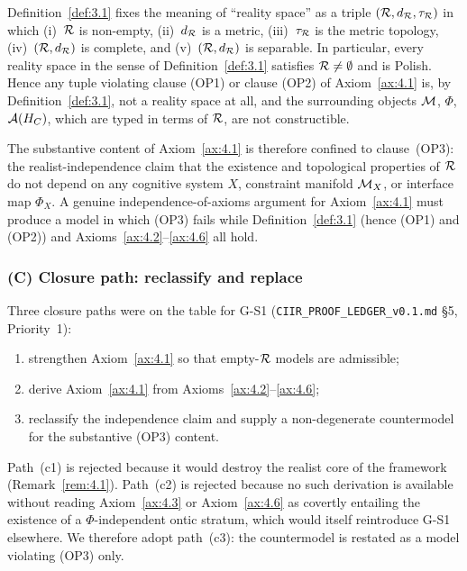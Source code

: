 \begin{remark}
\label{rem:4.1.op1op2.redundant}
Definition~\ref{def:3.1} fixes the meaning of ``reality space'' as a
triple $(\mathcal{R},d_{\mathcal{R}},\tau_{\mathcal{R}})$ in which (i)~$\mathcal{R}$ is non-empty,
(ii)~$d_{\mathcal{R}}$ is a metric, (iii)~$\tau_{\mathcal{R}}$ is the metric topology,
(iv)~$(\mathcal{R},d_{\mathcal{R}})$ is complete, and (v)~$(\mathcal{R},d_{\mathcal{R}})$ is
separable.  In particular, every reality space in the sense of
Definition~\ref{def:3.1} satisfies $\mathcal{R} \neq \emptyset$ and is
Polish.  Hence any tuple violating clause (OP1) or clause (OP2) of
Axiom~\ref{ax:4.1} is, by Definition~\ref{def:3.1}, not a reality
space at all, and the surrounding objects $\mathcal{M}$, $\Phi$, $\mathcal{A}(H_C)$,
which are typed in terms of $\mathcal{R}$, are not constructible.

The substantive content of Axiom~\ref{ax:4.1} is therefore confined
to clause~(OP3): the realist-independence claim that the existence
and topological properties of $\mathcal{R}$ do not depend on any cognitive
system $X$, constraint manifold $\mathcal{M}_X$, or interface map $\Phi_X$.
A genuine independence-of-axioms argument for Axiom~\ref{ax:4.1}
must produce a model in which (OP3) fails while
Definition~\ref{def:3.1} (hence (OP1) and (OP2)) and
Axioms~\ref{ax:4.2}--\ref{ax:4.6} all hold.
\end{remark}

\subsubsection*{(C) Closure path: reclassify and replace}

Three closure paths were on the table for G-S1
(\texttt{CIIR\_PROOF\_LEDGER\_v0.1.md} \S5, Priority~1):
\begin{enumerate}
  \item[(c1)] strengthen Axiom~\ref{ax:4.1} so that empty-$\mathcal{R}$
    models are admissible;
  \item[(c2)] derive Axiom~\ref{ax:4.1} from
    Axioms~\ref{ax:4.2}--\ref{ax:4.6};
  \item[(c3)] reclassify the independence claim and supply a
    non-degenerate countermodel for the substantive (OP3) content.
\end{enumerate}
Path~(c1) is rejected because it would destroy the realist core of
the framework (Remark~\ref{rem:4.1}).  Path~(c2) is rejected because
no such derivation is available without reading Axiom~\ref{ax:4.3}
or Axiom~\ref{ax:4.6} as covertly entailing the existence of a
$\Phi$-independent ontic stratum, which would itself reintroduce
G-S1 elsewhere.  We therefore adopt path~(c3): the countermodel is
restated as a model violating (OP3) only.

